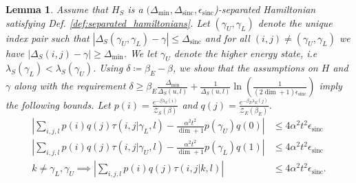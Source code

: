 \documentclass{article}
\newtheorem{lemma}[theorem]{Lemma}
\newcommand{\parens}[1]{\left( #1 \right)}
\newcommand{\abs}[1]{\left| #1 \right|}
\newcommand{\partfun}{\mathcal{Z}}
\DeclareMathOperator{\sinc}{sinc}
\begin{document}
\begin{lemma} \label{lem:big_tau_sum_simplifier}
    Assume that $H_S$ is a $(\Delta_{\min}, \Delta_{\sinc}, \epsilon_{\sinc}$)-separated Hamiltonian satisfying Def. \ref{def:separated_hamiltonians}. Let $(\gamma_U,\gamma_L)$ denote the unique index pair such that $|\Delta_S(\gamma_U,\gamma_L) - \gamma| \leq \Delta_{\sinc}$ and for all $(i,j) \neq (\gamma_U, \gamma_L)$ we have $|\Delta_S(i,j) - \gamma| \geq \Delta_{\min}$. We let $\gamma_U$ denote the higher energy state, i.e $\lambda_S(\gamma_L) < \lambda_S(\gamma_U)$. Using $\delta \coloneqq \beta_E - \beta$, we show that the assumptions on $H$ and $\gamma$ along with the requirement $\delta \geq \beta_E \frac{\Delta_{\min}}{\Delta_S(u,l)} + \frac{1}{\Delta_S(u,l)} \ln \parens{\frac{1}{(2\dim + 1) \epsilon_{\sinc}}}$ imply the following bounds.
    Let $p(i) = \frac{e^{-\beta \lambda_S(i)}}{\partfun_S(\beta)}$ and $q(j) = \frac{e^{-\beta_E \lambda_E(j)}}{\partfun_E(\beta_E)}$. 
    \begin{align}
        \abs{\sum_{i, j, l} p(i) q(j) \tau(i,j| \gamma_L, l) - \frac{\alpha^2 t^2}{\dim + 1} p(\gamma_U) q(0)} &\leq 4 \alpha^2 t^2 \epsilon_{\sinc}  \\
        \abs{\sum_{i, j, l} p(i) q(j) \tau(i,j| \gamma_U, l) - \frac{\alpha^2 t^2}{\dim + 1} p(\gamma_L) q(1)} &\leq 4  \alpha^2 t^2 \epsilon_{\sinc} \\
        k \neq \gamma_L, \gamma_U \implies \abs{\sum_{i,j,l} p(i) q(j) \tau(i,j| k, l) } &\leq 4 \alpha^2 t^2 \epsilon_{\sinc}.
    \end{align}
\end{lemma}
\end{document}
